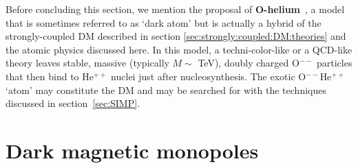 \bigskip

Before concluding this section, we mention the proposal of  {\bf O-helium}~\cite{Ohelium}, a model that is sometimes referred to as `dark atom' but is actually a hybrid of the strongly-coupled DM described in section \ref{sec:strongly:coupled:DM:theories} and the atomic physics discussed here. 
In this model, a techni-color-like or a QCD-like theory leaves stable, massive (typically $M \sim$ TeV), doubly charged O$^{--}$ particles that then bind to He$^{++}$ nuclei just after nucleosynthesis. The exotic O$^{--}$He$^{++}$ `atom' may constitute the DM and may be searched for with the techniques discussed in section~\ref{sec:SIMP}.
 





\section{Dark magnetic monopoles}
\label{Dmonopoles}

